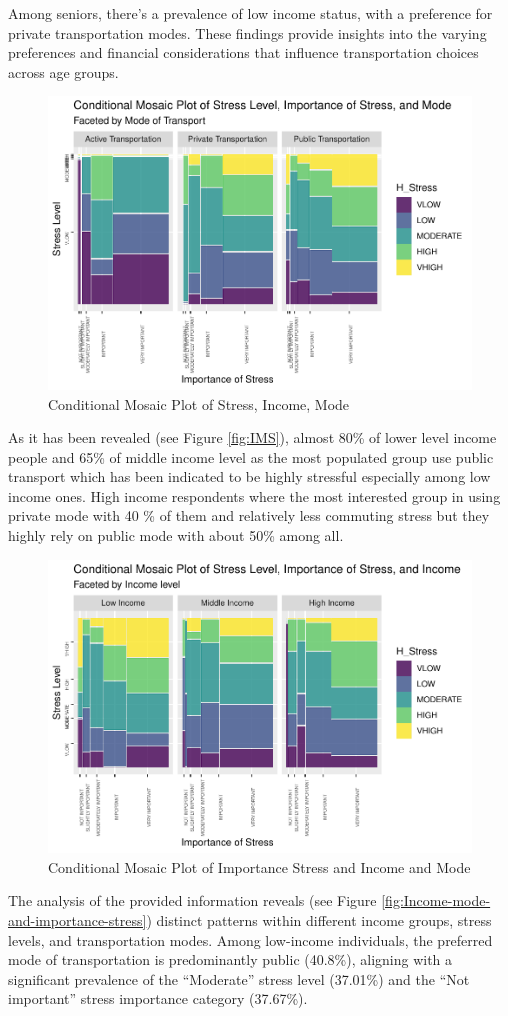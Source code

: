 \documentclass[
11pt, %
oneside, %
english, %
singlespacing, %
]{macthesis} %
\begin{document}
Among seniors, there's a prevalence of low income status, with a preference for private transportation modes. These findings provide insights into the varying preferences and financial considerations that influence transportation choices across age groups.
\begin{figure}
\includegraphics[width=0.85\linewidth]{thesis_files/figure-latex/unnamed-chunk-27-1} \caption{\label{fig:IMS}Conditional Mosaic Plot of Stress, Income, Mode}\label{fig:unnamed-chunk-27}
\end{figure}
As it has been revealed (see Figure \ref{fig:IMS}), almost 80\% of lower level income people and 65\% of middle income level as the most populated group use public transport which has been indicated to be highly stressful especially among low income ones. High income respondents where the most interested group in using private mode with 40 \% of them and relatively less commuting stress but they highly rely on public mode with about 50\% among all.
\begin{figure}
\includegraphics[width=0.85\linewidth]{thesis_files/figure-latex/unnamed-chunk-28-1} \caption{\label{fig:Income-mode-and-importance-stress}Conditional Mosaic Plot of Importance Stress and Income and Mode}\label{fig:unnamed-chunk-28}
\end{figure}
The analysis of the provided information reveals (see Figure \ref{fig:Income-mode-and-importance-stress}) distinct patterns within different income groups, stress levels, and transportation modes. Among low-income individuals, the preferred mode of transportation is predominantly public (40.8\%), aligning with a significant prevalence of the ``Moderate'' stress level (37.01\%) and the ``Not important'' stress importance category (37.67\%).
\end{document}
